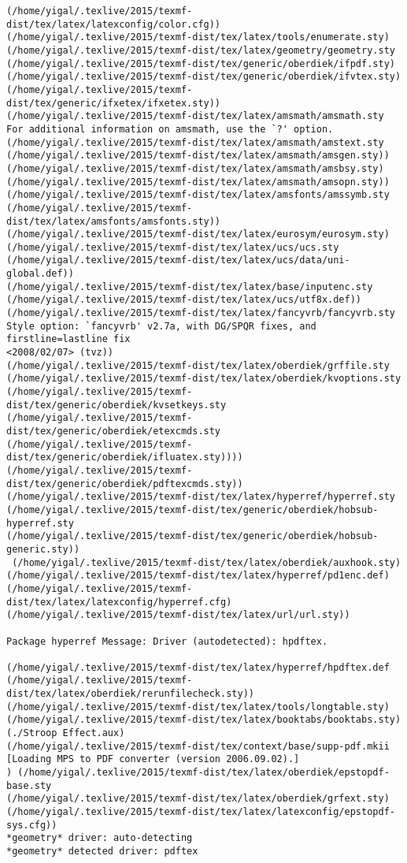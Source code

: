 \documentclass{article}
\begin{document}
\begin{Verbatim}[commandchars=\\\{\}]
(/home/yigal/.texlive/2015/texmf-dist/tex/latex/latexconfig/color.cfg))
(/home/yigal/.texlive/2015/texmf-dist/tex/latex/tools/enumerate.sty)
(/home/yigal/.texlive/2015/texmf-dist/tex/latex/geometry/geometry.sty
(/home/yigal/.texlive/2015/texmf-dist/tex/generic/oberdiek/ifpdf.sty)
(/home/yigal/.texlive/2015/texmf-dist/tex/generic/oberdiek/ifvtex.sty)
(/home/yigal/.texlive/2015/texmf-dist/tex/generic/ifxetex/ifxetex.sty))
(/home/yigal/.texlive/2015/texmf-dist/tex/latex/amsmath/amsmath.sty
For additional information on amsmath, use the `?' option.
(/home/yigal/.texlive/2015/texmf-dist/tex/latex/amsmath/amstext.sty
(/home/yigal/.texlive/2015/texmf-dist/tex/latex/amsmath/amsgen.sty))
(/home/yigal/.texlive/2015/texmf-dist/tex/latex/amsmath/amsbsy.sty)
(/home/yigal/.texlive/2015/texmf-dist/tex/latex/amsmath/amsopn.sty))
(/home/yigal/.texlive/2015/texmf-dist/tex/latex/amsfonts/amssymb.sty
(/home/yigal/.texlive/2015/texmf-dist/tex/latex/amsfonts/amsfonts.sty))
(/home/yigal/.texlive/2015/texmf-dist/tex/latex/eurosym/eurosym.sty)
(/home/yigal/.texlive/2015/texmf-dist/tex/latex/ucs/ucs.sty
(/home/yigal/.texlive/2015/texmf-dist/tex/latex/ucs/data/uni-global.def))
(/home/yigal/.texlive/2015/texmf-dist/tex/latex/base/inputenc.sty
(/home/yigal/.texlive/2015/texmf-dist/tex/latex/ucs/utf8x.def))
(/home/yigal/.texlive/2015/texmf-dist/tex/latex/fancyvrb/fancyvrb.sty
Style option: `fancyvrb' v2.7a, with DG/SPQR fixes, and firstline=lastline fix 
<2008/02/07> (tvz))
(/home/yigal/.texlive/2015/texmf-dist/tex/latex/oberdiek/grffile.sty
(/home/yigal/.texlive/2015/texmf-dist/tex/latex/oberdiek/kvoptions.sty
(/home/yigal/.texlive/2015/texmf-dist/tex/generic/oberdiek/kvsetkeys.sty
(/home/yigal/.texlive/2015/texmf-dist/tex/generic/oberdiek/etexcmds.sty
(/home/yigal/.texlive/2015/texmf-dist/tex/generic/oberdiek/ifluatex.sty))))
(/home/yigal/.texlive/2015/texmf-dist/tex/generic/oberdiek/pdftexcmds.sty))
(/home/yigal/.texlive/2015/texmf-dist/tex/latex/hyperref/hyperref.sty
(/home/yigal/.texlive/2015/texmf-dist/tex/generic/oberdiek/hobsub-hyperref.sty
(/home/yigal/.texlive/2015/texmf-dist/tex/generic/oberdiek/hobsub-generic.sty))
 (/home/yigal/.texlive/2015/texmf-dist/tex/latex/oberdiek/auxhook.sty)
(/home/yigal/.texlive/2015/texmf-dist/tex/latex/hyperref/pd1enc.def)
(/home/yigal/.texlive/2015/texmf-dist/tex/latex/latexconfig/hyperref.cfg)
(/home/yigal/.texlive/2015/texmf-dist/tex/latex/url/url.sty))

Package hyperref Message: Driver (autodetected): hpdftex.

(/home/yigal/.texlive/2015/texmf-dist/tex/latex/hyperref/hpdftex.def
(/home/yigal/.texlive/2015/texmf-dist/tex/latex/oberdiek/rerunfilecheck.sty))
(/home/yigal/.texlive/2015/texmf-dist/tex/latex/tools/longtable.sty)
(/home/yigal/.texlive/2015/texmf-dist/tex/latex/booktabs/booktabs.sty)
(./Stroop Effect.aux)
(/home/yigal/.texlive/2015/texmf-dist/tex/context/base/supp-pdf.mkii
[Loading MPS to PDF converter (version 2006.09.02).]
) (/home/yigal/.texlive/2015/texmf-dist/tex/latex/oberdiek/epstopdf-base.sty
(/home/yigal/.texlive/2015/texmf-dist/tex/latex/oberdiek/grfext.sty)
(/home/yigal/.texlive/2015/texmf-dist/tex/latex/latexconfig/epstopdf-sys.cfg))
*geometry* driver: auto-detecting
*geometry* detected driver: pdftex


\end{Verbatim}
\end{document}
